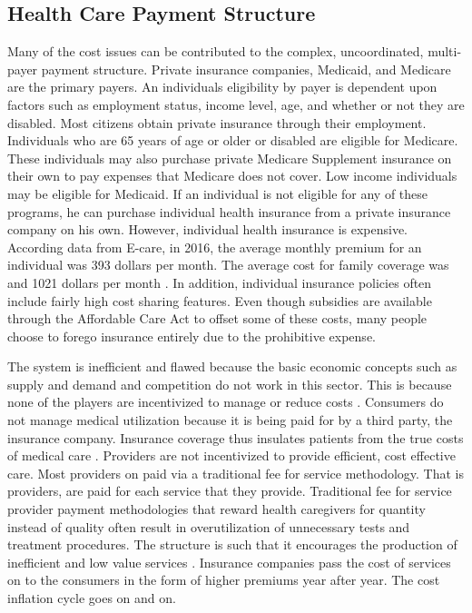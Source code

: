 \documentclass[sigconf]{acmart}
\begin{document}
\subsection{Health Care Payment Structure}
Many of the cost issues can be contributed to the complex, uncoordinated, multi-payer payment structure. Private insurance companies, Medicaid, and Medicare are the primary payers.  An individuals eligibility by payer is dependent upon factors such as employment status, income level, age, and whether or not they are disabled.  Most citizens obtain private insurance through their employment. Individuals who are 65 years of age or older or disabled are eligible for Medicare. These individuals may also purchase private Medicare Supplement insurance on their own to pay expenses that Medicare does not cover. Low income individuals may be eligible for Medicaid. If an individual is not eligible for any of these programs, he can purchase individual health insurance from a private insurance company on his own.  However, individual health insurance is expensive.  According data from E-care, in 2016, the average monthly premium for an individual was 393 dollars per month. The average cost for family coverage was and 1021 dollars per month \cite{www-google-cost}. In addition, individual insurance policies often include fairly high cost sharing features. Even though subsidies are available through the Affordable Care Act to offset some of these costs, many people choose to forego insurance entirely due to the prohibitive expense.


The system is inefficient and flawed because the basic economic concepts such as supply and demand and competition do not work in this sector. This is because none of the players are incentivized to manage or reduce costs \cite{milbank}.  Consumers do not manage medical utilization because it is being paid for by a third party, the insurance company.  Insurance coverage thus insulates patients from the true costs of medical care \cite{milbank}. Providers are not incentivized to provide efficient, cost effective care. Most providers on paid via a traditional fee for service methodology. That is providers, are paid for each service that they provide. Traditional fee for service provider payment methodologies that reward health caregivers for quantity instead of quality often result in overutilization of unnecessary tests and treatment procedures.  The structure is such that it encourages the production of inefficient and low value services \cite{milbank}.   Insurance companies pass the cost of services on to the consumers in the form of higher premiums year after year. The cost inflation cycle goes on and on.  
\end{document}
